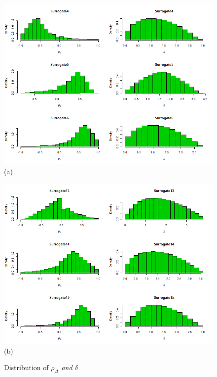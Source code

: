 \documentclass[a4paper,12pt]{article}
\begin{document}
	\begin{figure}[H]
		\centering
		\begin{minipage}{0.45\textwidth}
			\includegraphics[scale=0.35]{icaplots2.png}\\(a)
		\end{minipage} 
		\begin{minipage}{0.45\textwidth}
			\includegraphics[scale=0.35]{icaplots5.png}\\(b)
		\end{minipage} 
		\caption{Distribution of \emph{$\rho_{\Delta}$ and $\delta$}}\label{icaplot1}
	\end{figure}
	
	
\end{document}
